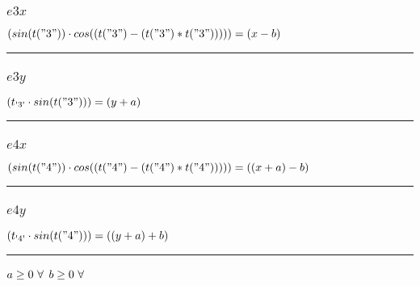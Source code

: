 \documentclass[11pt]{article}
\begin{document}
\subsubsection*{$e3x$}
$
(sin(t("3")) \cdot cos((t("3") - (t("3") * t("3"))))) = (x - b)
$
\vspace{5pt}
\hrule
\subsubsection*{$e3y$}
$
(t_\text{\text{\textquotesingle 3\textquotesingle}} \cdot sin(t("3"))) = (y + a)
$
\vspace{5pt}
\hrule
\subsubsection*{$e4x$}
$
(sin(t("4")) \cdot cos((t("4") - (t("4") * t("4"))))) = ((x + a) - b)
$
\vspace{5pt}
\hrule
\subsubsection*{$e4y$}
$
(t_\text{\text{\textquotesingle 4\textquotesingle}} \cdot sin(t("4"))) = ((y + a) + b)
$
\vspace{5pt}
\hrule
\bigskip
$a\geq 0 ~ \forall \\$
$b\geq 0 ~ \forall \\$
\end{document}
